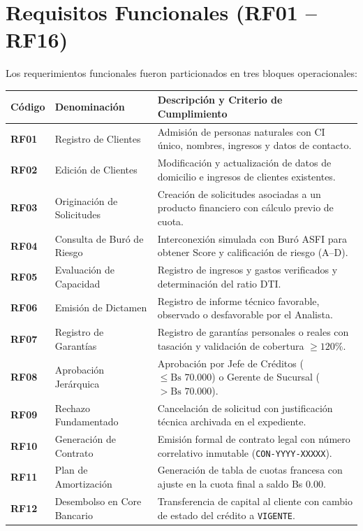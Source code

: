\documentclass[11pt,letterpaper]{report}
\begin{document}
\section{Requisitos Funcionales (RF01 -- RF16)}
Los requerimientos funcionales fueron particionados en tres bloques operacionales:

\begin{table}[htbp]
\centering
\footnotesize
\begin{tabularx}{\textwidth}{l l p{8.5cm}}
\toprule
\textbf{Código} & \textbf{Denominación} & \textbf{Descripción y Criterio de Cumplimiento} \\
\midrule
\textbf{RF01} & Registro de Clientes & Admisión de personas naturales con CI único, nombres, ingresos y datos de contacto. \\
\textbf{RF02} & Edición de Clientes & Modificación y actualización de datos de domicilio e ingresos de clientes existentes. \\
\textbf{RF03} & Originación de Solicitudes & Creación de solicitudes asociadas a un producto financiero con cálculo previo de cuota. \\
\textbf{RF04} & Consulta de Buró de Riesgo & Interconexión simulada con Buró ASFI para obtener Score y calificación de riesgo (A--D). \\
\textbf{RF05} & Evaluación de Capacidad & Registro de ingresos y gastos verificados y determinación del ratio DTI. \\
\textbf{RF06} & Emisión de Dictamen & Registro de informe técnico favorable, observado o desfavorable por el Analista. \\
\textbf{RF07} & Registro de Garantías & Registro de garantías personales o reales con tasación y validación de cobertura $\ge 120\%$. \\
\textbf{RF08} & Aprobación Jerárquica & Aprobación por Jefe de Créditos ($\le \text{Bs } 70.000$) o Gerente de Sucursal ($> \text{Bs } 70.000$). \\
\textbf{RF09} & Rechazo Fundamentado & Cancelación de solicitud con justificación técnica archivada en el expediente. \\
\textbf{RF10} & Generación de Contrato & Emisión formal de contrato legal con número correlativo inmutable (\texttt{CON-YYYY-XXXXX}). \\
\textbf{RF11} & Plan de Amortización & Generación de tabla de cuotas francesa con ajuste en la cuota final a saldo Bs 0.00. \\
\textbf{RF12} & Desembolso en Core Bancario & Transferencia de capital al cliente con cambio de estado del crédito a \texttt{VIGENTE}. \\

\end{tabularx}
\end{table}
\end{document}
